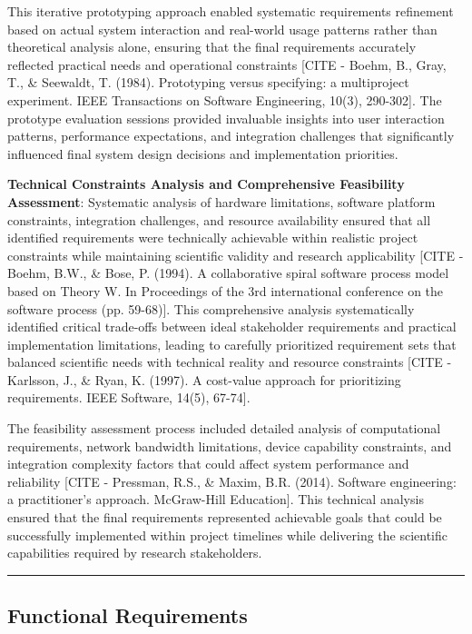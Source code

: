 \documentclass[11pt,a4paper]{report}
\begin{document}
This iterative prototyping approach enabled systematic requirements refinement based on actual system interaction and
real-world usage patterns rather than theoretical analysis alone, ensuring that the final requirements accurately
reflected practical needs and operational
constraints [CITE - Boehm, B., Gray, T., \& Seewaldt, T. (1984). Prototyping versus specifying: a multiproject experiment. IEEE Transactions on Software Engineering, 10(3), 290-302].
The prototype evaluation sessions provided invaluable insights into user interaction patterns, performance expectations,
and integration challenges that significantly influenced final system design decisions and implementation priorities.

\textbf{Technical Constraints Analysis and Comprehensive Feasibility Assessment}: Systematic analysis of hardware
limitations, software platform constraints, integration challenges, and resource availability ensured that all
identified requirements were technically achievable within realistic project constraints while maintaining scientific
validity and research
applicability [CITE - Boehm, B.W., \& Bose, P. (1994). A collaborative spiral software process model based on Theory W. In Proceedings of the 3rd international conference on the software process (pp. 59-68)].
This comprehensive analysis systematically identified critical trade-offs between ideal stakeholder requirements and
practical implementation limitations, leading to carefully prioritized requirement sets that balanced scientific needs
with technical reality and resource
constraints [CITE - Karlsson, J., \& Ryan, K. (1997). A cost-value approach for prioritizing requirements. IEEE Software, 14(5), 67-74].

The feasibility assessment process included detailed analysis of computational requirements, network bandwidth
limitations, device capability constraints, and integration complexity factors that could affect system performance and
reliability [CITE - Pressman, R.S., \& Maxim, B.R. (2014). Software engineering: a practitioner's approach. McGraw-Hill Education].
This technical analysis ensured that the final requirements represented achievable goals that could be successfully
implemented within project timelines while delivering the scientific capabilities required by research stakeholders.

\hrule

\subsection{Functional Requirements}
\end{document}
